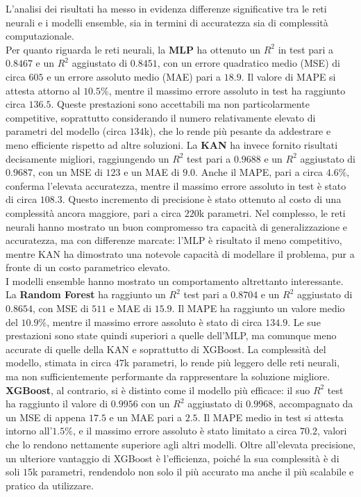\documentclass[a4paper,12pt]{report}
\begin{document}
	L’analisi dei risultati ha messo in evidenza differenze significative tra le reti neurali e i modelli ensemble, sia in termini di accuratezza sia di complessità computazionale. \\
	Per quanto riguarda le reti neurali, la \textbf{MLP} ha ottenuto un $R^2$ in test pari a $0.8467$ e un $R^2$ aggiustato di $0.8451$, con un errore quadratico medio (MSE) di circa $605$ e un errore assoluto medio (MAE) pari a $18.9$. Il valore di MAPE si attesta attorno al $10.5\%$, mentre il massimo errore assoluto in test ha raggiunto circa $136.5$. Queste prestazioni sono accettabili ma non particolarmente competitive, soprattutto considerando il numero relativamente elevato di parametri del modello (circa $134$k), che lo rende più pesante da addestrare e meno efficiente rispetto ad altre soluzioni. La \textbf{KAN} ha invece fornito risultati decisamente migliori, raggiungendo un $R^2$ test pari a $0.9688$ e un $R^2$ aggiustato di $0.9687$, con un MSE di $123$ e un MAE di $9.0$. Anche il MAPE, pari a circa $4.6\%$, conferma l’elevata accuratezza, mentre il massimo errore assoluto in test è stato di circa $108.3$. Questo incremento di precisione è stato ottenuto al costo di una complessità ancora maggiore, pari a circa $220$k parametri. Nel complesso, le reti neurali hanno mostrato un buon compromesso tra capacità di generalizzazione e accuratezza, ma con differenze marcate: l’MLP è risultato il meno competitivo, mentre KAN ha dimostrato una notevole capacità di modellare il problema, pur a fronte di un costo parametrico elevato. \\
	I modelli ensemble hanno mostrato un comportamento altrettanto interessante. La \textbf{Random Forest} ha raggiunto un $R^2$ test pari a $0.8704$ e un $R^2$ aggiustato di $0.8654$, con MSE di $511$ e MAE di $15.9$. Il MAPE ha raggiunto un valore medio del $10.9\%$, mentre il massimo errore assoluto è stato di circa $134.9$. Le sue prestazioni sono state quindi superiori a quelle dell’MLP, ma comunque meno accurate di quelle della KAN e soprattutto di XGBoost. La complessità del modello, stimata in circa $47$k parametri, lo rende più leggero delle reti neurali, ma non sufficientemente performante da rappresentare la soluzione migliore. \textbf{XGBoost}, al contrario, si è distinto come il modello più efficace: il suo $R^2$ test ha raggiunto il valore di $0.9956$ con un $R^2$ aggiustato di $0.9968$, accompagnato da un MSE di appena $17.5$ e un MAE pari a $2.5$. Il MAPE medio in test si attesta intorno all’$1.5\%$, e il massimo errore assoluto è stato limitato a circa $70.2$, valori che lo rendono nettamente superiore agli altri modelli. Oltre all’elevata precisione, un ulteriore vantaggio di XGBoost è l’efficienza, poiché la sua complessità è di soli $15$k parametri, rendendolo non solo il più accurato ma anche il più scalabile e pratico da utilizzare. \\
	
\end{document}
